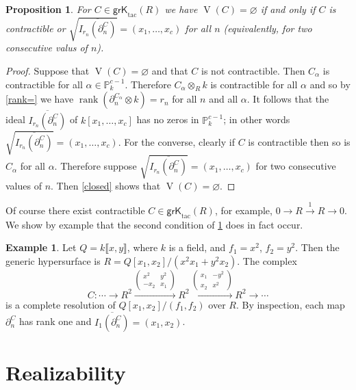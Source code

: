 \documentclass{amsart}[11pt]
\newcommand{\rank}{\operatorname{rank}}
\newcommand{\V}{\operatorname{V}}
\newcommand{\grKtac}{\operatorname{\mathsf{grK}_{tac}}\nolimits}
\numberwithin{equation}{section}
\theoremstyle{plain}
\newtheorem*{Main Theorem}{Main Theorem}
\newtheorem{proposition}[theorem]{Proposition}
\theoremstyle{definition}
\newtheorem{example}[theorem]{Example}
\theoremstyle{remark}
\numberwithin{equation}{theorem}
\begin{document}
\begin{proposition}\label{Dades} For $C\in\grKtac(R)$ we have $\V(C)=\varnothing$ if and only if 
$C$ is contractible or $\sqrt{\overline{I_{r_n}(\partial_n^C)}}=(x_1,\dots,x_c)$ for all $n$ (equivalently, for two consecutive valus of $n$).
\end{proposition}

\begin{proof} Suppose that $\V(C)=\varnothing$ and that $C$ is not contractible. Then $C_\alpha$ is contractible for all $\alpha\in\mathbb P^{c-1}_k$. Therefore $C_\alpha\otimes_Rk$ is contractible for all $\alpha$ and so by \ref{rank=} we have $\rank(\partial_n^{C_\alpha}\otimes k)=r_n$ for all $n$ and all $\alpha$. It follows that the ideal $\overline{I_{r_n}(\partial_n^C)}$ of $k[x_1,\dots,x_c]$ has no zeros in $\mathbb P^{c-1}_k$; in other words $\sqrt{\overline{I_{r_n}(\partial_n^C)}}=(x_1,\dots,x_c)$. For the converse, clearly if $C$ is contractible then so is $C_\alpha$ for all $\alpha$. Therefore suppose $\sqrt{\overline{I_{r_n}(\partial_n^C)}}=(x_1,\dots,x_c)$ for two consecutive values of $n$. Then \ref{closed} shows that $\V(C)=\varnothing$.
\end{proof}

Of course there exist contractible $C\in\grKtac(R)$, for example, $0\to R\xrightarrow{1} R \to 0$. We show by example that the second condition of \ref{Dades} does in fact occur.

\begin{example} Let $Q=k\llbracket x,y\rrbracket$, where $k$ is a field, and $f_1=x^2$, $f_2=y^2$.  Then the generic hypersurface is $R=Q[x_1,x_2]/(x^2x_1+y^2x_2)$. The complex 
\[
C: \cdots\to R^2 \xrightarrow{\left(\begin{array}{cc} x^2 & y^2\\ -x_2 & x_1 \end{array}\right)} R^2
\xrightarrow{\left(\begin{array}{cc} x_1 & -y^2\\ x_2 & x^2 \end{array}\right)} R^2 \to\cdots
\]
is a complete resolution of $Q[x_1,x_2]/(f_1,f_2)$ over $R$. By inspection, each map $\partial^C_n$ has rank one and $\overline{I_1(\partial_n^C)}=(x_1,x_2)$.
\end{example}







\section{Realizability}
\end{document}
